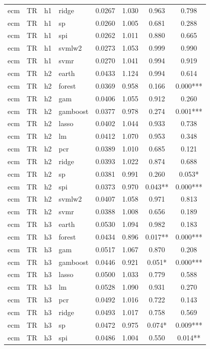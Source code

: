 \begin{ThreePartTable}
\begin{longtable}[t]{llclcccc}
ecm & TR & h1 & ridge & 0.0267 & 1.030 & 0.963 & 0.798\\
ecm & TR & h1 & sp & 0.0260 & 1.005 & 0.681 & 0.288\\
ecm & TR & h1 & spi & 0.0262 & 1.011 & 0.880 & 0.665\\
ecm & TR & h1 & svmlw2 & 0.0273 & 1.053 & 0.999 & 0.990\\
ecm & TR & h1 & svmr & 0.0270 & 1.041 & 0.994 & 0.919\\
\addlinespace
ecm & TR & h2 & earth & 0.0433 & 1.124 & 0.994 & 0.614\\
ecm & TR & h2 & forest & 0.0369 & 0.958 & 0.166 & 0.000***\\
ecm & TR & h2 & gam & 0.0406 & 1.055 & 0.912 & 0.260\\
ecm & TR & h2 & gamboost & 0.0377 & 0.978 & 0.274 & 0.001***\\
ecm & TR & h2 & lasso & 0.0402 & 1.044 & 0.933 & 0.738\\
ecm & TR & h2 & lm & 0.0412 & 1.070 & 0.953 & 0.348\\
ecm & TR & h2 & pcr & 0.0389 & 1.010 & 0.685 & 0.121\\
ecm & TR & h2 & ridge & 0.0393 & 1.022 & 0.874 & 0.688\\
ecm & TR & h2 & sp & 0.0381 & 0.991 & 0.260 & 0.053*\\
ecm & TR & h2 & spi & 0.0373 & 0.970 & 0.043** & 0.000***\\
ecm & TR & h2 & svmlw2 & 0.0407 & 1.058 & 0.971 & 0.813\\
ecm & TR & h2 & svmr & 0.0388 & 1.008 & 0.656 & 0.189\\
\addlinespace
ecm & TR & h3 & earth & 0.0530 & 1.094 & 0.982 & 0.183\\
ecm & TR & h3 & forest & 0.0434 & 0.896 & 0.017** & 0.000***\\
ecm & TR & h3 & gam & 0.0517 & 1.067 & 0.870 & 0.208\\
ecm & TR & h3 & gamboost & 0.0446 & 0.921 & 0.051* & 0.000***\\
ecm & TR & h3 & lasso & 0.0500 & 1.033 & 0.779 & 0.588\\
ecm & TR & h3 & lm & 0.0528 & 1.090 & 0.931 & 0.270\\
ecm & TR & h3 & pcr & 0.0492 & 1.016 & 0.722 & 0.143\\
ecm & TR & h3 & ridge & 0.0493 & 1.017 & 0.758 & 0.569\\
ecm & TR & h3 & sp & 0.0472 & 0.975 & 0.074* & 0.009***\\
ecm & TR & h3 & spi & 0.0486 & 1.004 & 0.550 & 0.014**\\

\end{longtable}
\end{ThreePartTable}

